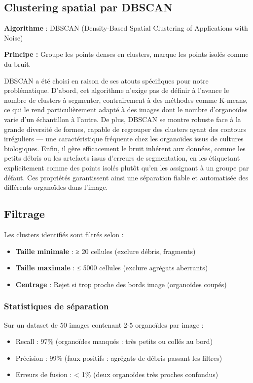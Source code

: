 \subsection{Clustering spatial par DBSCAN}

\textbf{Algorithme} : DBSCAN (Density-Based Spatial Clustering of Applications with Noise)

\textbf{Principe :}
Groupe les points denses en clusters, marque les points isolés comme du bruit.

DBSCAN a été choisi en raison de ses atouts spécifiques pour notre problématique. D'abord, cet algorithme n'exige pas de définir à l'avance le nombre de clusters à segmenter, contrairement à des méthodes comme K-means, ce qui le rend particulièrement adapté à des images dont le nombre d'organoïdes varie d'un échantillon à l'autre. De plus, DBSCAN se montre robuste face à la grande diversité de formes, capable de regrouper des clusters ayant des contours irréguliers — une caractéristique fréquente chez les organoïdes issus de cultures biologiques. Enfin, il gère efficacement le bruit inhérent aux données, comme les petits débris ou les artefacts issus d'erreurs de segmentation, en les étiquetant explicitement comme des points isolés plutôt qu’en les assignant à un groupe par défaut. Ces propriétés garantissent ainsi une séparation fiable et automatisée des différents organoïdes dans l'image.

\subsection{Filtrage}

Les clusters identifiés sont filtrés selon :
\begin{itemize}
    \item \textbf{Taille minimale} : ≥ 20 cellules (exclure débris, fragments)
    \item \textbf{Taille maximale} : ≤ 5000 cellules (exclure agrégats aberrants)
    \item \textbf{Centrage} : Rejet si trop proche des bords image (organoïdes coupés)
\end{itemize}

\subsubsection{Statistiques de séparation}

Sur un dataset de 50 images contenant 2-5 organoïdes par image :
\begin{itemize}
    \item Recall : 97\% (organoïdes manqués : très petits ou collés au bord)
    \item Précision : 99\% (faux positifs : agrégats de débris passant les filtres)
    \item Erreurs de fusion : < 1\% (deux organoïdes très proches confondus)
\end{itemize}

